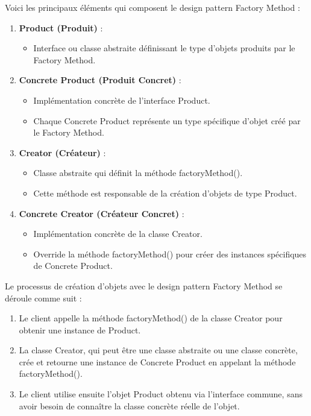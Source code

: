 \documentclass[french]{article}
\begin{document}
Voici les principaux éléments qui composent le design pattern Factory Method :

\begin{enumerate}
    \item \textbf{Product (Produit)} :
    \begin{itemize}
        \item Interface ou classe abstraite définissant le type d'objets produits par le Factory Method.
    \end{itemize}
    
    \item \textbf{Concrete Product (Produit Concret)} :
    \begin{itemize}
        \item Implémentation concrète de l'interface Product.
        \item Chaque Concrete Product représente un type spécifique d'objet créé par le Factory Method.
    \end{itemize}
    
    \item \textbf{Creator (Créateur)} :
    \begin{itemize}
        \item Classe abstraite qui définit la méthode factoryMethod().
        \item Cette méthode est responsable de la création d'objets de type Product.
    \end{itemize}
    
    \item \textbf{Concrete Creator (Créateur Concret)} :
    \begin{itemize}
        \item Implémentation concrète de la classe Creator.
        \item Override la méthode factoryMethod() pour créer des instances spécifiques de Concrete Product.
    \end{itemize}
\end{enumerate}

Le processus de création d'objets avec le design pattern Factory Method se déroule comme suit :

\begin{enumerate}
    \item Le client appelle la méthode factoryMethod() de la classe Creator pour obtenir une instance de Product.
    \item La classe Creator, qui peut être une classe abstraite ou une classe concrète, crée et retourne une instance de Concrete Product en appelant la méthode factoryMethod().
    \item Le client utilise ensuite l'objet Product obtenu via l'interface commune, sans avoir besoin de connaître la classe concrète réelle de l'objet.
\end{enumerate}
\end{document}
